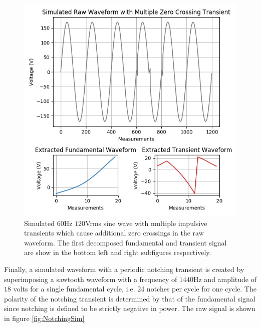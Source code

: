 \documentclass[10pt, conference, compsocconf]{IEEEtran}
\begin{document}
\begin{figure}[h]
\centering%
\includegraphics[scale=0.35]{./figures/mult_z_crossing_sim.png}
\caption{Simulated $60$Hz $120$Vrms sine wave with multiple impulsive transients which cause additional zero crossings in the raw waveform. The first decomposed fundamental and transient signal are show in the bottom left and right subfigures respectively.}\label{fig:MultZSim}
\end{figure}

Finally, a simulated waveform with a periodic notching transient is created by superimposing a sawtooth waveform with a frequency of $1440$Hz and amplitude of $18$ volts for a single fundamental cycle, i.e. 24 notches per cycle for one cycle. The polarity of the notching transient is determined by that of the fundamental signal since notching is defined to be strictly negative in power. The raw signal is shown in figure \ref{fig:NotchingSim}
\end{document}
